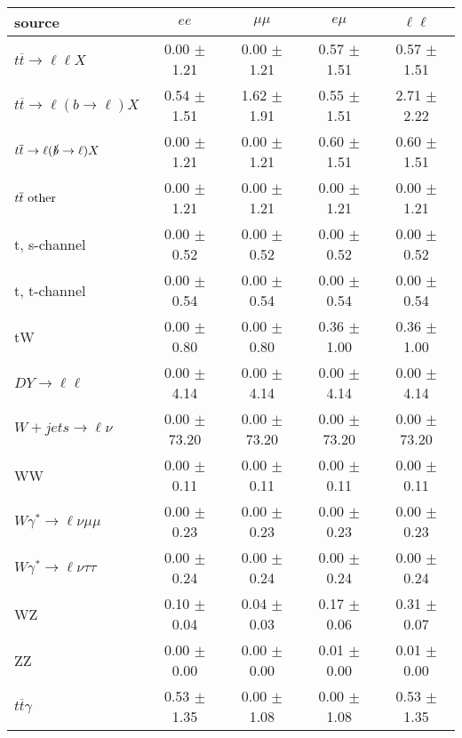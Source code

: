 \begin{tabular}{l|cccc} \hline\hline
source & $ee$ & $\mu\mu$ & $e\mu$ & $\ell\ell $ \\
\hline
$t\overline{t} \rightarrow \ell \ell X$ &  0.00 $\pm$  1.21 &  0.00 $\pm$  1.21 &  0.57 $\pm$  1.51 &  0.57 $\pm$  1.51 \\
$t\overline{t} \rightarrow \ell (b \rightarrow \ell) X$ &  0.54 $\pm$  1.51 &  1.62 $\pm$  1.91 &  0.55 $\pm$  1.51 &  2.71 $\pm$  2.22 \\
$t\overline{t} \rightarrow \ell (\slashed b \rightarrow \ell) X$ &  0.00 $\pm$  1.21 &  0.00 $\pm$  1.21 &  0.60 $\pm$  1.51 &  0.60 $\pm$  1.51 \\
        $t\overline{t}\ \rm{other}$ &  0.00 $\pm$  1.21 &  0.00 $\pm$  1.21 &  0.00 $\pm$  1.21 &  0.00 $\pm$  1.21 \\
\hline
                       t, s-channel &  0.00 $\pm$  0.52 &  0.00 $\pm$  0.52 &  0.00 $\pm$  0.52 &  0.00 $\pm$  0.52 \\
                       t, t-channel &  0.00 $\pm$  0.54 &  0.00 $\pm$  0.54 &  0.00 $\pm$  0.54 &  0.00 $\pm$  0.54 \\
                                 tW &  0.00 $\pm$  0.80 &  0.00 $\pm$  0.80 &  0.36 $\pm$  1.00 &  0.36 $\pm$  1.00 \\
\hline
         $DY \rightarrow \ell \ell$ &  0.00 $\pm$  4.14 &  0.00 $\pm$  4.14 &  0.00 $\pm$  4.14 &  0.00 $\pm$  4.14 \\
      $W+jets \rightarrow \ell \nu$ &  0.00 $\pm$ 73.20 &  0.00 $\pm$ 73.20 &  0.00 $\pm$ 73.20 &  0.00 $\pm$ 73.20 \\
                                 WW &  0.00 $\pm$  0.11 &  0.00 $\pm$  0.11 &  0.00 $\pm$  0.11 &  0.00 $\pm$  0.11 \\
\hline
$W\gamma^{*} \rightarrow \ell \nu \mu\mu$ &  0.00 $\pm$  0.23 &  0.00 $\pm$  0.23 &  0.00 $\pm$  0.23 &  0.00 $\pm$  0.23 \\
$W\gamma^{*} \rightarrow \ell \nu \tau\tau$ &  0.00 $\pm$  0.24 &  0.00 $\pm$  0.24 &  0.00 $\pm$  0.24 &  0.00 $\pm$  0.24 \\
                                 WZ &  0.10 $\pm$  0.04 &  0.04 $\pm$  0.03 &  0.17 $\pm$  0.06 &  0.31 $\pm$  0.07 \\
                                 ZZ &  0.00 $\pm$  0.00 &  0.00 $\pm$  0.00 &  0.01 $\pm$  0.00 &  0.01 $\pm$  0.00 \\
\hline
              $t\overline{t}\gamma$ &  0.53 $\pm$  1.35 &  0.00 $\pm$  1.08 &  0.00 $\pm$  1.08 &  0.53 $\pm$  1.35 \\

\end{tabular}

